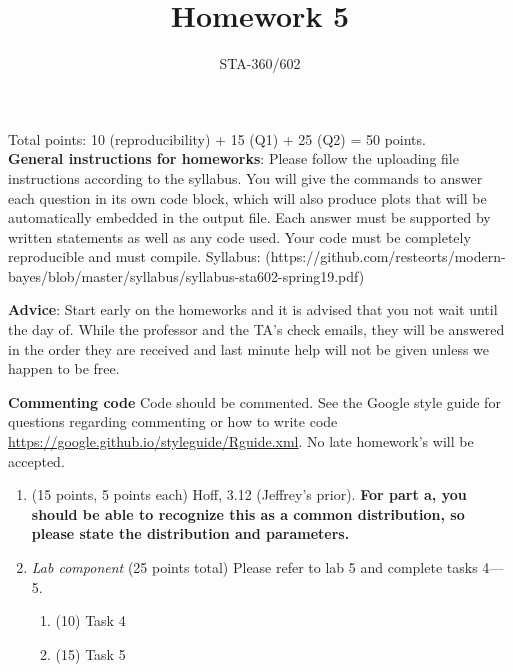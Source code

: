 \documentclass{article}
\begin{document}
\title{Homework 5}
\author{STA-360/602}
\date{}

\maketitle

Total points: 10 (reproducibility) + 15 (Q1) + 25 (Q2) = 50 points. \\

\textbf{General instructions for homeworks}: Please follow the uploading file instructions according to the syllabus. You will give the commands to answer each question in its own code block, which will also produce plots that will be automatically embedded in the output file. Each answer must be supported by written statements as well as any code used. Your code must be completely reproducible and must compile. Syllabus: (https://github.com/resteorts/modern-bayes/blob/master/syllabus/syllabus-sta602-spring19.pdf)

\textbf{Advice}: Start early on the homeworks and it is advised that you not wait until the day of. While the professor and the TA's check emails, they will be answered in the order they are received and last minute help will not be given unless we happen to be free.  

\textbf{Commenting code}
Code should be commented. See the Google style guide for questions regarding commenting or how to write 
code \url{https://google.github.io/styleguide/Rguide.xml}. No late homework's will be accepted.

\begin{enumerate}
\item (15 points, 5 points each) Hoff, 3.12 (Jeffrey's prior). 
\textbf{For part a, you should be able to recognize this as a common distribution, so please state the distribution and parameters.}


\item {\em Lab component} 
  (25 points total) Please refer to lab 5 and complete tasks 4---5. 
  \begin{enumerate}
  \item (10) Task 4
  \item (15) Task 5
  \end{enumerate}
  
\end{enumerate}
\end{document}
